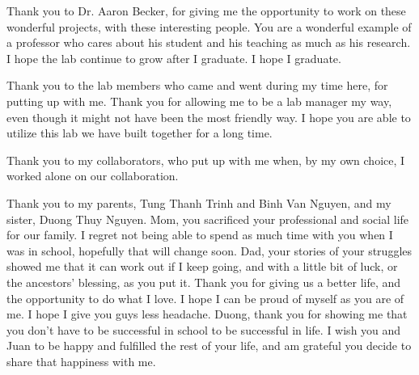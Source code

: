 

Thank you to Dr. Aaron Becker, for giving me the opportunity to work on these wonderful projects, with these interesting people.
You are a wonderful example of a professor who cares about his student and his teaching as much as his research.
I hope the lab continue to grow after I graduate.
I hope I graduate.

Thank you to the lab members who came and went during my time here, for putting up with me.
Thank you for allowing me to be a lab manager my way, even though it might not have been the most friendly way.
I hope you are able to utilize this lab we have built together for a long time.

Thank you to my collaborators, who put up with me when, by my own choice, I worked alone on our collaboration.

Thank you to my parents, Tung Thanh Trinh and Binh Van Nguyen, and my sister, Duong Thuy Nguyen.
Mom, you sacrificed your professional and social life for our family.
I regret not being able to spend as much time with you when I was in school, hopefully that will change soon.
Dad, your stories of your struggles showed me that it can work out if I keep going, and with a little bit of luck, or the ancestors' blessing, as you put it.
Thank you for giving us a better life, and the opportunity to do what I love.
I hope I can be proud of myself as you are of me.
I hope I give you guys less headache.
Duong, thank you for showing me that you don't have to be successful in school to be successful in life.
I wish you and Juan to be happy and fulfilled the rest of your life, and am grateful you decide to share that happiness with me.
